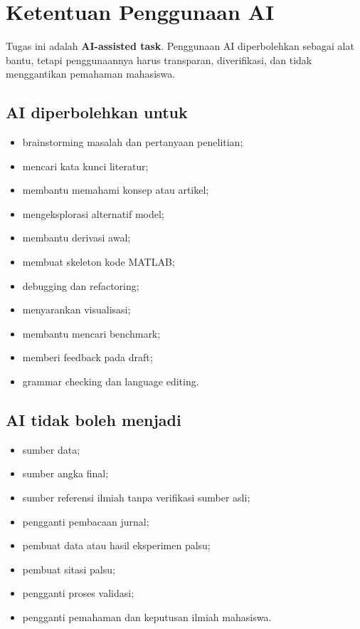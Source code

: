 \documentclass[11pt,a4paper]{article}
\begin{document}
\section{Ketentuan Penggunaan AI}

Tugas ini adalah \textbf{AI-assisted task}. Penggunaan AI diperbolehkan sebagai alat bantu, tetapi penggunaannya harus transparan, diverifikasi, dan tidak menggantikan pemahaman mahasiswa.

\subsection{AI diperbolehkan untuk}
\begin{itemize}
    \item brainstorming masalah dan pertanyaan penelitian;
    \item mencari kata kunci literatur;
    \item membantu memahami konsep atau artikel;
    \item mengeksplorasi alternatif model;
    \item membantu derivasi awal;
    \item membuat skeleton kode MATLAB;
    \item debugging dan refactoring;
    \item menyarankan visualisasi;
    \item membantu mencari benchmark;
    \item memberi feedback pada draft;
    \item grammar checking dan language editing.
\end{itemize}

\subsection{AI tidak boleh menjadi}
\begin{itemize}
    \item sumber data;
    \item sumber angka final;
    \item sumber referensi ilmiah tanpa verifikasi sumber asli;
    \item pengganti pembacaan jurnal;
    \item pembuat data atau hasil eksperimen palsu;
    \item pembuat sitasi palsu;
    \item pengganti proses validasi;
    \item pengganti pemahaman dan keputusan ilmiah mahasiswa.
\end{itemize}
\end{document}
